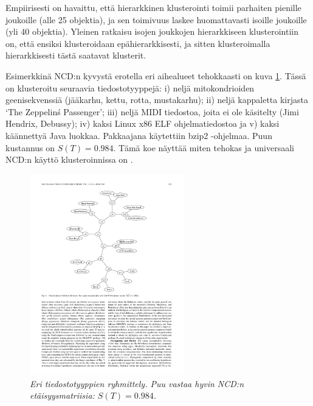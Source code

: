 \documentclass[12pt,finnish]{tktltiki2}
\theoremstyle{definition}
\theoremstyle{remark}
\begin{document}
    Empiirisesti on havaittu, että hierarkkinen klusterointi toimii parhaiten pienille joukoille (alle 25 objektia), ja sen toimivuus laskee huomattavasti isoille joukoille (yli 40 objektia).
    Yleinen ratkaisu isojen joukkojen hierarkkiseen klusterointiin on, että ensiksi klusteroidaan epähierarkkisesti, ja sitten klusteroimalla hierarkkisesti tästä saatavat klusterit.

    Esimerkkinä NCD:n kyvystä erotella eri aihealueet tehokkaasti on kuva \ref{fig:classification}.
    Tässä on klusteroitu seuraavia tiedostotyyppejä: i) neljä mitokondrioiden geenisekvenssiä (jääkarhu, kettu, rotta, mustakarhu); ii) neljä kappaletta kirjasta `The Zeppelin\'s Passenger'; iii) neljä MIDI tiedostoa, joita ei ole käsitelty (Jimi Hendrix, Debussy); iv) kaksi Linux x86 ELF ohjelmatiedostoa ja v) kaksi käännettyä Java luokkaa.
    Pakkaajana käytettiin bzip2 -ohjelmaa.
    Puun kustannus on $S(T)=0.984$.
    Tämä koe näyttää miten tehokas ja universaali NCD:n käyttö klusteroinnissa on \cite{CV05}.

    \begin{figure}[tb]
      \immediate{}
      \includegraphics[width=0.6\textwidth]{img/classification}
      \caption{\emph{Eri tiedostotyyppien ryhmittely. Puu vastaa hyvin NCD:n etäisyysmatriisia: $S(T)=0.984$.}
      \cite{CV05} }
      \label{fig:classification}
    \end{figure}
\end{document}
